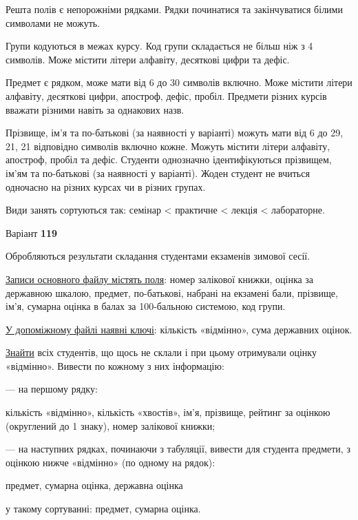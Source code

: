 \documentclass[11pt, ukrainian]{article}
\begin{document}
Решта полів є непорожніми рядками.
Рядки починатися та закінчуватися білими символами не можуть.

Групи кодуються в межах курсу.
Код групи складається не більш ніж з 4 символів.
Може містити літери алфавіту, десяткові цифри та дефіс.

Предмет є рядком, може мати від 6 до 30 символів включно.
Може містити літери алфавіту, десяткові цифри, апостроф, дефіс, пробіл.
Предмети різних курсів вважати різними навіть за однакових назв.

Прізвище, ім’я та по-батькові (за наявності у варіанті)
можуть мати від 6 до 29, 21, 21 відповідно символів включно кожне.
Можуть містити літери алфавіту, апостроф, пробіл та дефіс.
Студенти однозначно ідентифікуються прізвищем, ім’ям та по-батькові (за наявності у варіанті).
Жоден студент не вчиться одночасно на різних курсах чи в різних групах.

Види занять сортуються так: семінар < практичне < лекція < лабораторне.





\par
\newpage
{\center Варіант  \No \textbf { 119 }\par}
\bigskip
Обробляються результати складання студентами екзаменів зимової сесії.

\underline{Записи основного файлу містять поля}: номер залікової книжки, оцінка за державною шкалою, предмет, по-батькові, набрані на екзамені бали, прізвище, ім’я, сумарна оцінка в балах за 100-бальною системою, код групи.

\underline{У допоміжному файлі наявні ключі}: кількість «відмінно», сума державних оцінок.

\underline{Знайти} всіх студентів, що щось не склали і при цьому отримували оцінку «відмінно». Вивести по кожному з них інформацію:\par
{\noindent}--- на першому рядку:\par
кількість «відмінно», кількість «хвостів», ім’я, прізвище, рейтинг за оцінкою (округлений до 1 знаку), номер залікової книжки;

{\noindent}--- на наступних рядках, починаючи з табуляції, вивести для студента предмети, з оцінкою нижче «відмінно» (по одному на рядок):\par
предмет, сумарна оцінка, державна оцінка

{\noindent}у такому сортуванні: предмет, сумарна оцінка.
\end{document}
